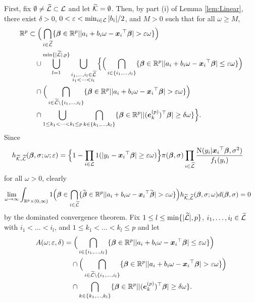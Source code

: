 \documentclass[12pt]{article}
\def\ep{{\varepsilon}}
\def\si{{\sigma}}
\def\de{{\delta}}
\def\ep{{\varepsilon}}
\def\si{{\sigma}}
\def\om{{\omega}}
\def\non{{\nonumber}}
\def\Lc{{\cal L}}
\def\Kc{{\cal K}}
\def\de{{\delta}}
\def\ep{{\varepsilon}}
\def\si{{\sigma}}
\def\om{{\omega}}
\def\bbe{{\text{\boldmath $\beta$}}}
\def\bbet{{\widetilde \bbe}}
\def\e{{\text{\boldmath $e$}}}
\def\x{{\text{\boldmath $x$}}}
\def\Lc{{\cal L}}
\def\Kc{{\cal K}}
\def\non{{\nonumber}}
\begin{document}
First, fix $\emptyset \neq \widetilde{\Lc } \subset \Lc $ and let $\widetilde{\Kc } = \emptyset $. 
Then, by part (i) of Lemma \ref{lem:Linear}, there exist $\de > 0$, $0 < \ep < \min_{i \in \Lc } | b_i | / 2$, and $M > 0$ such that for all $\om \ge M$, 
\begin{align}
\mathbb{R} ^p &\subset \Big( \bigcap_{i \in \widetilde{\Lc }} \{ \bbe \in \mathbb{R} ^p | | a_i + b_i \om - {\x _i}^{\top } \bbe | > \ep \om \} \Big) \non \\
&\quad \cup \bigcup_{l = 1}^{\min \{ | \widetilde{\Lc } |, p \} } \bigcup_{\substack{i_1 , \dots , i_l \in \widetilde{\Lc } \\ i_1 < \dots < i_l}} \Big\{ \Big( \bigcap_{i \in \{ i_1 , \dots , i_l \} } \{ \bbe \in \mathbb{R} ^p | | a_i + b_i \om - {\x _i}^{\top } \bbe | \le \ep \om \} \Big) \non \\
&\quad \cap \Big( \bigcap_{i \in \widetilde{\Lc } \setminus \{ i_1 , \dots , i_l \} } \{ \bbe \in \mathbb{R} ^p | | a_i + b_i \om - {\x _i}^{\top } \bbe | > \ep \om \} \Big) \non \\
&\quad \cap \bigcup_{1 \le k_1 < \dots < k_l \le p} \bigcap_{k \in \{ k_1 , \dots , k_l \} } \{ \bbe \in \mathbb{R} ^p | | ( \e _{k}^{(p)} )^{\top } \bbe | \ge \de \om \} \Big\} \text{.} \non 
\end{align}
Since 
\begin{align}
h_{\widetilde{\Kc } , \widetilde{\Lc }} ( \bbe , \si ; \om ; \ep ) &= \Big\{ 1 - \prod_{i \in \Lc } 1(| y_i - {\x _i}^{\top } \bbe | \ge \ep \om ) \Big\} \pi ( \bbe , \si ) \prod_{i \in \widetilde{\Lc }} {{\rm{N}} ( y_i | {\x _i}^{\top } \bbe , \si ^2 ) \over f_1 ( y_i )} \non 
\end{align}
for all $\om > 0$, clearly 
\begin{align}
\lim_{\om \to \infty } \int_{\mathbb{R} ^p \times (0, \infty )} 1 \Big( \bbe \in \bigcap_{i \in \widetilde{\Lc }} \{ \bbet \in \mathbb{R} ^p | | a_i + b_i \om - {\x _i}^{\top } \bbet | > \ep \om \} \Big) h_{\widetilde{\Kc } , \widetilde{\Lc }} ( \bbe , \si ; \om ) d( \bbe , \si ) &= 0 \non 
\end{align}
by the dominated convergence theorem. 
Fix $1 \le l \le \min \{ | \widetilde{\Lc } |, p \} $, $i_1 , \dots , i_l \in \widetilde{\Lc }$ with $i_1 < \dots < i_l$, and $1 \le k_1 < \dots < k_l \le p$ and let 
\begin{align}
A( \om ; \ep , \de ) &= \Big( \bigcap_{i \in \{ i_1 , \dots , i_l \} } \{ \bbe \in \mathbb{R} ^p | | a_i + b_i \om - {\x _i}^{\top } \bbe | \le \ep \om \} \Big) \non \\
&\quad \cap \Big( \bigcap_{i \in \widetilde{\Lc } \setminus \{ i_1 , \dots , i_l \} } \{ \bbe \in \mathbb{R} ^p | | a_i + b_i \om - {\x _i}^{\top } \bbe | > \ep \om \} \Big) \non \\
&\quad \cap \bigcap_{k \in \{ k_1 , \dots , k_l \} } \{ \bbe \in \mathbb{R} ^p | | ( \e _{k}^{(p)} )^{\top } \bbe | \ge \de \om \} \text{.} \non 
\end{align}
\end{document}
